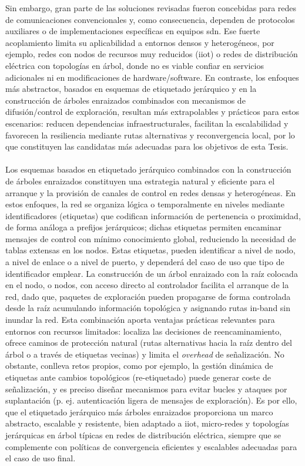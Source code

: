 Sin embargo, gran parte de las soluciones revisadas fueron concebidas para redes de comunicaciones convencionales y, como consecuencia, dependen de protocolos auxiliares o de implementaciones específicas en equipos \gls{sdn}. Ese fuerte acoplamiento limita su aplicabilidad a entornos densos y heterogéneos, por ejemplo, redes con nodos de recursos muy reducidos (\gls{iiot}) o redes de distribución eléctrica con topologías en árbol, donde no es viable confiar en servicios adicionales ni en modificaciones de hardware/software. En contraste, los enfoques más abstractos, basados en esquemas de etiquetado jerárquico y en la construcción de árboles enraizados combinados con mecanismos de difusión/control de exploración, resultan más extrapolables y prácticos para estos escenarios: reducen dependencias infraestructurales, facilitan la escalabilidad y favorecen la resiliencia mediante rutas alternativas y reconvergencia local, por lo que constituyen las candidatas más adecuadas para los objetivos de esta Tesis.\\
\\
Los esquemas basados en etiquetado jerárquico combinados con la construcción de árboles enraizados constituyen una estrategia natural y eficiente para el arranque y la provisión de canales de control en redes densas y heterogéneas. En estos enfoques, la red se organiza lógica o temporalmente en niveles mediante identificadores (etiquetas) que codifican información de pertenencia o proximidad, de forma análoga a prefijos jerárquicos; dichas etiquetas permiten encaminar mensajes de control con mínimo conocimiento global, reduciendo la necesidad de tablas extensas en los nodos. Estas etiquetas, pueden identificar a nivel de nodo, a nivel de enlace o a nivel de puerto, y dependerá del caso de uso que tipo de identificador emplear. La construcción de un árbol enraizado con la raíz colocada en el nodo, o nodos, con acceso directo al controlador facilita el arranque de la red, dado que, paquetes de exploración pueden propagarse de forma controlada desde la raíz acumulando información topológica y asignando rutas in-band sin inundar la red. Esta combinación aporta ventajas prácticas relevantes para entornos con recursos limitados: localiza las decisiones de reencaminamiento, ofrece caminos de protección natural (rutas alternativas hacia la raíz dentro del árbol o a través de etiquetas vecinas) y limita el \textit{overhead} de señalización. No obstante, conlleva retos propios, como por ejemplo, la gestión dinámica de etiquetas ante cambios topológicos (re-etiquetado) puede generar coste de señalización, y es preciso diseñar mecanismos para evitar bucles y ataques por suplantación (p. ej. autenticación ligera de mensajes de exploración). Es por ello, que el etiquetado jerárquico más árboles enraizados proporciona un marco abstracto, escalable y resistente, bien adaptado a \gls{iiot}, micro-redes y topologías jerárquicas en árbol típicas en redes de distribución eléctrica, siempre que se complemente con políticas de convergencia eficientes y escalables adecuadas para el caso de uso final.\\
